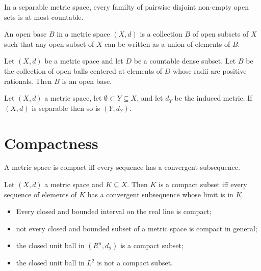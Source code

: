 \documentclass{article}
\begin{document}
\begin{proposition}[8.3]
	In a separable metric space, every familty of pairwise disjoint non-empty open
	sets is at most countable.
\end{proposition}

\begin{definition}
	An open base $B$ in a metric space $(X,d)$ is a collection $B$ of open subsets
	of $X$ such that any open subset of $X$ can be written as a union of elements of $B$.
\end{definition}

\begin{proposition}[8.5]
	Let $(X,d)$ be a metric space and let $D$ be a countable dense subset. Let $B$
	be the collection of open balls centered at elements of $D$ whose radii are positive
	rationals. Then $B$ is an open base.
\end{proposition}

\begin{proposition}[8.6]
	Let $(X,d)$ a metric space, let $\emptyset\subset Y\subseteq X$, and let
	$d_Y$ be the induced metric. If $(X,d)$ is separable then so is $(Y,d_Y)$.
\end{proposition}

\section{Compactness}

\begin{definition}
	A metric space is compact iff every sequence has a convergent subsequence.
\end{definition}

\begin{definition}
	Let $(X,d)$ a metric space and $K\subseteq X$. Then $K$ is a compact subset iff
	every sequence of elements of $K$ has a convergent subsequence whose limit is in
	$K$.
\end{definition}
\begin{itemize}
	\item Every closed and bounded interval on the real line is compact;
	\item not every closed and bounded subset of a metric space is compact in general;
	\item the closed unit ball in $(R^n,d_2)$ is a compact subset;
	\item the closed unit ball in $L^2$ is not a compact subset.
\end{itemize}
\end{document}
